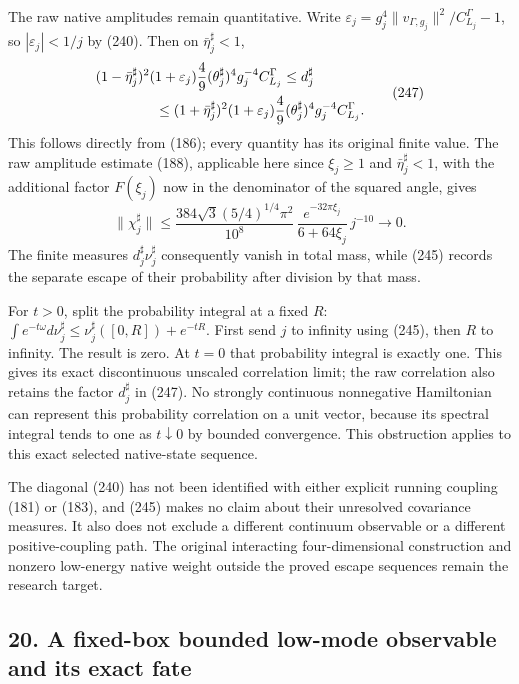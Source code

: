 \documentclass[
  11pt,
]{article}
\begin{document}
The raw native amplitudes remain quantitative. Write
\(\varepsilon_j=g_j^4\|v_{\Gamma,g_j}\|^2/C_{L_j}^\Gamma-1\), so
\(|\varepsilon_j|<1/j\) by (240). Then on \(\bar\eta_j^\sharp<1\), \[
 \begin{split}
 &(1-\bar\eta_j^\sharp)^2(1+\varepsilon_j)
       \frac49(\theta_j^\sharp)^4g_j^{-4}C_{L_j}^\Gamma
       \le d_j^\sharp\\
 &\hspace{15mm}\le
 (1+\bar\eta_j^\sharp)^2(1+\varepsilon_j)
       \frac49(\theta_j^\sharp)^4g_j^{-4}C_{L_j}^\Gamma .
 \end{split}
 \tag{247}
\] This follows directly from (186); every quantity has its original
finite value. The raw amplitude estimate (188), applicable here since
\(\xi_j\ge1\) and \(\bar\eta_j^\sharp<1\), with the additional factor
\(F(\xi_j)\) now in the denominator of the squared angle, gives \[
 \|\chi_j^\sharp\|
 \le\frac{384\sqrt3(5/4)^{1/4}\pi^2}{10^8}\,
      \frac{e^{-32\pi\xi_j}}{6+64\xi_j}\,j^{-10}
 \longrightarrow0.
 \tag{248}
\] The finite measures \(d_j^\sharp\nu_j^\sharp\) consequently vanish in
total mass, while (245) records the separate escape of their probability
after division by that mass.

For \(t>0\), split the probability integral at a fixed \(R\):
\(\int e^{-t\omega}d\nu_j^\sharp
\le\nu_j^\sharp([0,R])+e^{-tR}\). First send \(j\) to infinity using
(245), then \(R\) to infinity. The result is zero. At \(t=0\) that
probability integral is exactly one. This gives its exact discontinuous
unscaled correlation limit; the raw correlation also retains the factor
\(d_j^\sharp\) in (247). No strongly continuous nonnegative Hamiltonian
can represent this probability correlation on a unit vector, because its
spectral integral tends to one as \(t\downarrow0\) by bounded
convergence. This obstruction applies to this exact selected
native-state sequence.

The diagonal (240) has not been identified with either explicit running
coupling (181) or (183), and (245) makes no claim about their unresolved
covariance measures. It also does not exclude a different continuum
observable or a different positive-coupling path. The original
interacting four-dimensional construction and nonzero low-energy native
weight outside the proved escape sequences remain the research target.

\subsection{20. A fixed-box bounded low-mode observable and its exact
fate}\label{a-fixed-box-bounded-low-mode-observable-and-its-exact-fate}
\end{document}
